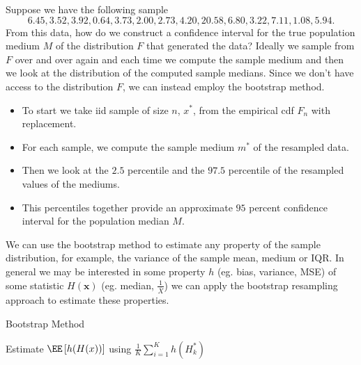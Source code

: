 \begin{exam} \label{exam: bootstrap_median}
    Suppose we have the following sample
    \begin{equation*}
        6.45 , 3.52 , 3.92 , 0.64 , 3.73 , 2.00, 2.73 , 4.20, 20.58, 6.80, 3.22, 7.11, 1.08 , 5.94.
    \end{equation*}
    From this data, how do we construct a confidence interval for the true population medium $M$ of the distribution $F$ that generated the data? Ideally we sample from $F$ over and over again and each time we compute the sample medium and then we look at the distribution of the computed sample medians. Since we don't have access to the distribution $F$, we can instead employ the bootstrap method.
    \begin{itemize}
        \item To start we take iid sample of size $n$, $x^{\ast}$, from the empirical cdf $F_n$ with replacement.
        \item For each sample, we compute the sample medium $m^{\ast}$ of the resampled data.
        \item Then we look at the $2.5$ percentile and the $97.5$ percentile of the resampled values of the mediums.
        \item This percentiles together provide an approximate $95$ percent confidence interval for the population median $M$.
    \end{itemize}
\end{exam}

We can use the bootstrap method to estimate any property of the sample distribution, for example, the variance of the sample mean, medium or IQR. In general we may be interested in some property $h$ (eg. bias, variance, MSE) of some statistic $H(\bm{x})$ (eg. median, $\frac{1}{\overline{X}}$) we can apply the bootstrap resampling approach to estimate these properties.

    {\centering
        \begin{minipage}{.85\linewidth}
            \begin{algorithm}[H]
                \caption{Bootstrap Method}
                \label{alg: bootstrap}
                \SetAlgoLined
                \DontPrintSemicolon

                \BlankLine
                Estimate $\EE \left[ h(H(x)) \right]$ using $\frac{1}{K} \sum_{i=1}^{K} h(H_k^{\ast})$
                \BlankLine
            \end{algorithm}
        \end{minipage}
        \par
    }

